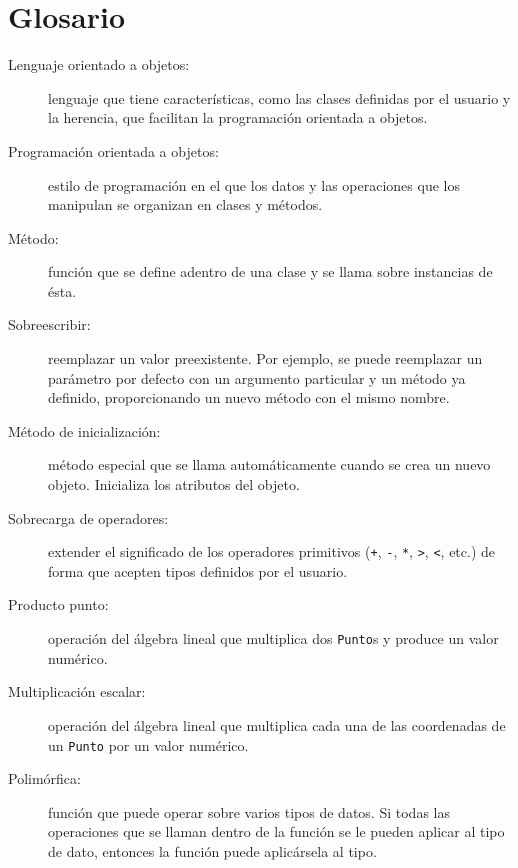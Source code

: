 \section{Glosario}
\begin{description}
\item [{Lenguaje orientado a objetos:}] lenguaje que tiene características,
como las clases definidas por el usuario y la herencia, que facilitan
la programación orientada a objetos.
\item [{Programación orientada a objetos:}] estilo de programación en
el que los datos y las operaciones que los manipulan se organizan
en clases y métodos.
\item [{Método:}] función que se define adentro de una clase y se llama
sobre instancias de ésta.
\item [{Sobreescribir:}] reemplazar un valor preexistente. Por ejemplo,
se puede reemplazar un parámetro por defecto con un argumento particular
y un método ya definido, proporcionando un nuevo método con el mismo
nombre.
\item [{Método de inicialización:}] método especial que se llama automáticamente
cuando se crea un nuevo objeto. Inicializa los atributos del objeto.
\item [{Sobrecarga de operadores:}] extender el significado de los operadores
primitivos (\texttt{+}, \texttt{-}, \texttt{{*}}, \texttt{>}, \texttt{<},
etc.) de forma que acepten tipos definidos por el usuario.
\item [{Producto punto:}] operación del álgebra lineal que multiplica
dos \texttt{Punto}s y produce un valor numérico.
\item [{Multiplicación escalar:}] operación del álgebra lineal que multiplica
cada una de las coordenadas de un \texttt{Punto} por un valor numérico.
\item [{Polimórfica:}] función que puede operar sobre varios tipos de datos.
Si todas las operaciones que se llaman dentro de la función se le
pueden aplicar al tipo de dato, entonces la función puede aplicársela
al tipo.

 
  
  
\end{description}

